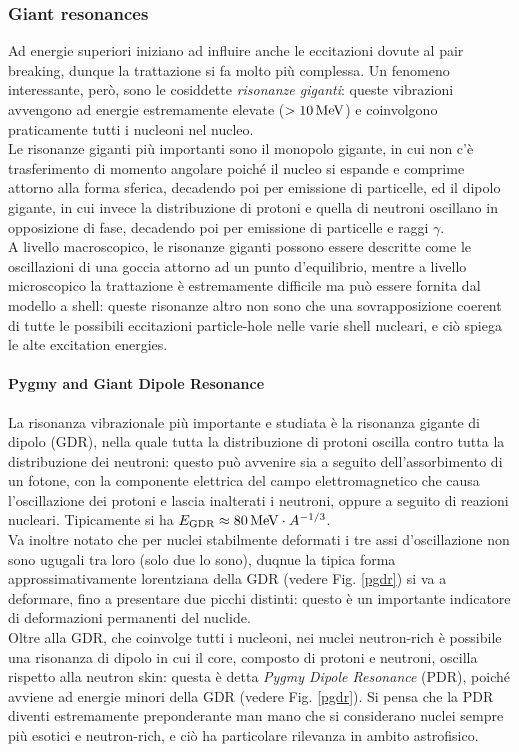 \subsubsection{Giant resonances}

Ad energie superiori iniziano ad influire anche le eccitazioni dovute al pair breaking, dunque la trattazione si fa molto più complessa. Un fenomeno interessante, però, sono le cosiddette \textit{risonanze giganti}: queste vibrazioni avvengono ad energie estremamente elevate ($ > 10\,\mathrm{MeV} $) e coinvolgono praticamente tutti i nucleoni nel nucleo.\\
Le risonanze giganti più importanti sono il monopolo gigante, in cui non c'è trasferimento di momento angolare poiché il nucleo si espande e comprime attorno alla forma sferica, decadendo poi per emissione di particelle, ed il dipolo gigante, in cui invece la distribuzione di protoni e quella di neutroni oscillano in opposizione di fase, decadendo poi per emissione di particelle e raggi $ \gamma $.\\
A livello macroscopico, le risonanze giganti possono essere descritte come le oscillazioni di una goccia attorno ad un punto d'equilibrio, mentre a livello microscopico la trattazione è estremamente difficile ma può essere fornita dal modello a shell: queste risonanze altro non sono che una sovrapposizione coerent di tutte le possibili eccitazioni particle-hole nelle varie shell nucleari, e ciò spiega le alte excitation energies.

\paragraph{Pygmy and Giant Dipole Resonance}

La risonanza vibrazionale più importante e studiata è la risonanza gigante di dipolo (GDR), nella quale tutta la distribuzione di protoni oscilla contro tutta la distribuzione dei neutroni: questo può avvenire sia a seguito dell'assorbimento di un fotone, con la componente elettrica del campo elettromagnetico che causa l'oscillazione dei protoni e lascia inalterati i neutroni, oppure a seguito di reazioni nucleari. Tipicamente si ha $ E_{\text{GDR}} \approx 80\,\mathrm{MeV} \cdot A^{-1/3} $.\\
Va inoltre notato che per nuclei stabilmente deformati i tre assi d'oscillazione non sono ugugali tra loro (solo due lo sono), duqnue la tipica forma approssimativamente lorentziana della GDR (vedere Fig. \ref{pgdr}) si va a deformare, fino a presentare due picchi distinti: questo è un importante indicatore di deformazioni permanenti del nuclide.\\
Oltre alla GDR, che coinvolge tutti i nucleoni, nei nuclei neutron-rich è possibile una risonanza di dipolo in cui il core, composto di protoni e neutroni, oscilla rispetto alla neutron skin: questa è detta \textit{Pygmy Dipole Resonance} (PDR), poiché avviene ad energie minori della GDR (vedere Fig. \ref{pgdr}). Si pensa che la PDR diventi estremamente preponderante man mano che si considerano nuclei sempre più esotici e neutron-rich, e ciò ha particolare rilevanza in ambito astrofisico.

